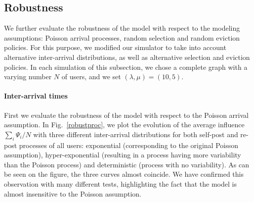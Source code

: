 \documentclass[10pt, conference, letterpaper]{IEEEtran}
\begin{document}
{	
\subsection{Robustness} \label{robust}
	
We further evaluate the robustness of the model with respect to the modeling assumptions: Poisson arrival processes, random selection and random eviction policies. For this purpose, we modified our simulator to take into account alternative inter-arrival distributions, as well as alternative selection and eviction policies.
In each simulation of this subsection, we chose a complete graph with a varying number $N$ of users, and we set $(\lambda,\mu)=(10,5)$.
	
\paragraph{Inter-arrival times} First we evaluate the robustness of the model with respect to the Poisson arrival assumption.
In Fig.~\ref{robustproc}, we plot the evolution of the average influence $\sum_i \Psi_i/N$ with three different inter-arrival distributions for both self-post and re-post processes of all users: exponential (corresponding to the original Poisson assumption), hyper-exponential (resulting in a process having more variability than the Poisson process) and deterministic (process with no variability). As can be seen on the figure, the three curves almost coincide. We have confirmed this observation with many different tests, highlighting the fact that the model is almost insensitive to the Poisson assumption.

}
\end{document}
